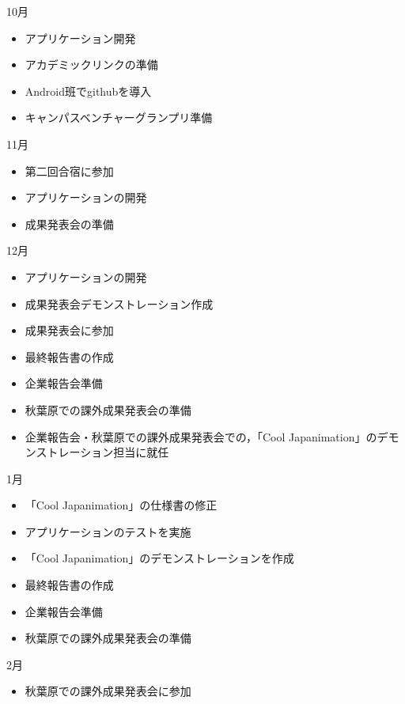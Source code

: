 10月
\begin{itemize}
\item アプリケーション開発
\item アカデミックリンクの準備
\item Android班でgithubを導入
\item キャンパスベンチャーグランプリ準備
\end{itemize}
11月
\begin{itemize}
\item 第二回合宿に参加
\item アプリケーションの開発
\item 成果発表会の準備
\end{itemize}
12月
\begin{itemize}
\item アプリケーションの開発
\item 成果発表会デモンストレーション作成
\item 成果発表会に参加
\item 最終報告書の作成
\item 企業報告会準備
\item 秋葉原での課外成果発表会の準備
\item 企業報告会・秋葉原での課外成果発表会での，「Cool Japanimation」のデモンストレーション担当に就任
\end{itemize}
1月
\begin{itemize}
\item 「Cool Japanimation」の仕様書の修正
\item アプリケーションのテストを実施
\item 「Cool Japanimation」のデモンストレーションを作成
\item 最終報告書の作成
\item 企業報告会準備
\item 秋葉原での課外成果発表会の準備
\end{itemize}
2月
\begin{itemize}
\item 秋葉原での課外成果発表会に参加
\end{itemize}

